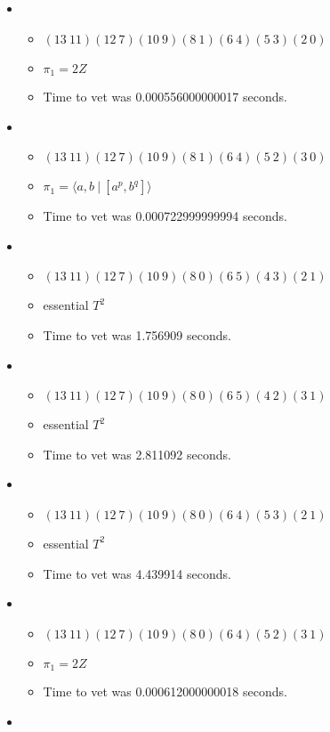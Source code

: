 \documentclass{article}
\begin{document}
\begin{itemize}
\begin{itemize}
\end{itemize}
\item \begin{itemize}
      \item $(13\ 11)(12\ 7)(10\ 9)(8\ 1)(6\ 4)(5\ 3)(2\ 0)$
      \item $\pi_1 =2 Z$
      \item Time to vet was 0.000556000000017 seconds.
\end{itemize}
\item \begin{itemize}
      \item $(13\ 11)(12\ 7)(10\ 9)(8\ 1)(6\ 4)(5\ 2)(3\ 0)$
      \item $\pi_1 = \langle a,b\ |\ [a^p,b^q]\rangle$
      \item Time to vet was 0.000722999999994 seconds.
\end{itemize}
\item \begin{itemize}
      \item $(13\ 11)(12\ 7)(10\ 9)(8\ 0)(6\ 5)(4\ 3)(2\ 1)$
      \item essential $T^2$
      \item Time to vet was 1.756909 seconds.
\end{itemize}
\item \begin{itemize}
      \item $(13\ 11)(12\ 7)(10\ 9)(8\ 0)(6\ 5)(4\ 2)(3\ 1)$
      \item essential $T^2$
      \item Time to vet was 2.811092 seconds.
\end{itemize}
\item \begin{itemize}
      \item $(13\ 11)(12\ 7)(10\ 9)(8\ 0)(6\ 4)(5\ 3)(2\ 1)$
      \item essential $T^2$
      \item Time to vet was 4.439914 seconds.
\end{itemize}
\item \begin{itemize}
      \item $(13\ 11)(12\ 7)(10\ 9)(8\ 0)(6\ 4)(5\ 2)(3\ 1)$
      \item $\pi_1 =2 Z$
      \item Time to vet was 0.000612000000018 seconds.
\end{itemize}
\item \begin{itemize}

\end{itemize}
\end{itemize}
\end{document}
